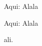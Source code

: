 


\newenvironment{aqui}{\par Aqui:}{\par\dotfill\par}

\begin{aqui}
Alala
\end{aqui}

\begin{aqui}
Alala
\end{aqui}
ali.

